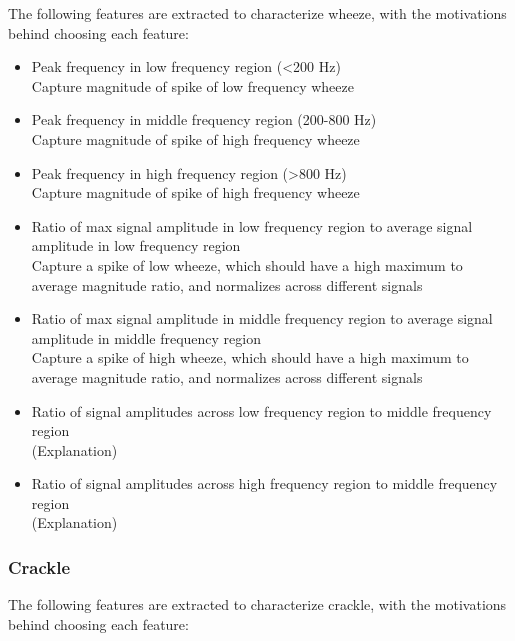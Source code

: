 \documentclass{article}
\begin{document}
The following features are extracted to characterize wheeze, with the motivations behind choosing each feature: \\
\begin{itemize}
\item
	Peak frequency in low frequency region (<200 Hz)\\
	Capture magnitude of spike of low frequency wheeze\\
\item
	Peak frequency in middle frequency region (200-800 Hz)\\
	Capture magnitude of spike of high frequency wheeze\\
\item
	Peak frequency in high frequency region (>800 Hz)\\
	Capture magnitude of spike of high frequency wheeze\\
\item
	Ratio of max signal amplitude in low frequency region to average signal amplitude in low frequency region\\
	Capture a spike of low wheeze, which should have a high maximum to average magnitude ratio, and normalizes across different signals\\
\item
	Ratio of max signal amplitude in middle frequency region to average signal amplitude in middle frequency region\\
	Capture a spike of high wheeze, which should have a high maximum to average magnitude ratio, and normalizes across different signals\\
\item
	Ratio of signal amplitudes across low frequency region to middle frequency region\\
	(Explanation)\\
\item
	Ratio of signal amplitudes across high frequency region to middle frequency region\\
	(Explanation)\\
\end{itemize}

\subsubsection{Crackle}

The following features are extracted to characterize crackle, with the motivations behind choosing each feature: \\
\end{document}
